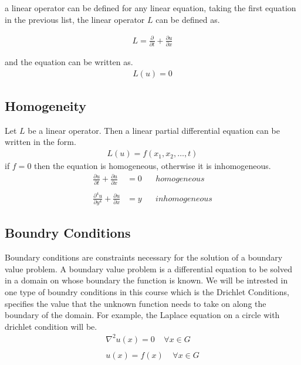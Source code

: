 \documentclass[]{article}
\begin{document}
a linear operator can be defined for any linear equation, taking the first equation in the previous list, the linear operator $L$ can be defined as.

\begin{align*}
L = \frac{\partial }{\partial t} + \frac{\partial u}{\partial x}
\end{align*} 

and the equation can be written as.
\begin{align*}
L(u)=0
\end{align*}


\subsection*{Homogeneity}
Let $L$ be a linear operator. Then a linear partial differential equation can be written in the form.
\begin{align*}
L(u) = f(x_1,x_2, \dots , t)
\end{align*}
if $f = 0$ then the equation is homogeneous, otherwise it is inhomogeneous.
\begin{align*}
\frac{\partial u}{\partial t} + \frac{\partial u}{\partial x} &= 0 \;\;\;\;\;\; homogeneous
\\
\\
\frac{\partial^4 u}{\partial y^4} + \frac{\partial u}{\partial x} &= y \;\;\;\;\;\; inhomogeneous
\end{align*}


\subsection*{Boundry Conditions}

Boundary conditions are constraints necessary for the solution of a boundary value problem. A boundary value problem is a differential equation to be solved in a domain on whose boundary the function is known. We will be intrested in one type of boundry conditions in this course which is the Drichlet Conditions, specifies the value that the unknown function needs to take on along the boundary of the domain. For example, the Laplace equation on a circle with drichlet condition will be.
\begin{align*}
\nabla^2 u(x) = 0 \;\;\;\; \forall x \in G
\\
\\
u(x) = f(x) \;\;\;\; \forall x \in G
\end{align*}
\end{document}
